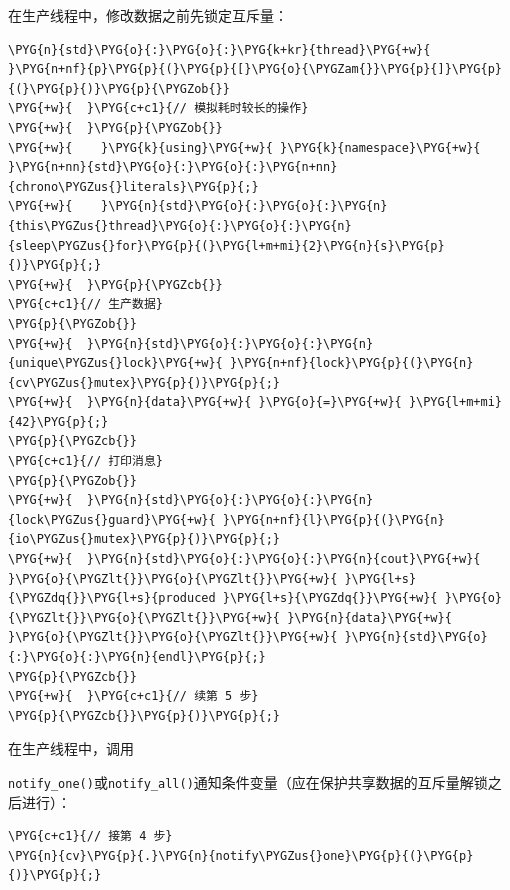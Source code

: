 
在生产线程中，修改数据之前先锁定互斥量：



\begin{codeblockbg}
\begin{Verbatim}[commandchars=\\\{\},breaklines=true,breakanywhere=true,fontsize=\codefont,xleftmargin=17bp]
\PYG{n}{std}\PYG{o}{:}\PYG{o}{:}\PYG{k+kr}{thread}\PYG{+w}{ }\PYG{n+nf}{p}\PYG{p}{(}\PYG{p}{[}\PYG{o}{\PYGZam{}}\PYG{p}{]}\PYG{p}{(}\PYG{p}{)}\PYG{p}{\PYGZob{}}
\PYG{+w}{  }\PYG{c+c1}{// 模拟耗时较长的操作}
\PYG{+w}{  }\PYG{p}{\PYGZob{}}
\PYG{+w}{    }\PYG{k}{using}\PYG{+w}{ }\PYG{k}{namespace}\PYG{+w}{ }\PYG{n+nn}{std}\PYG{o}{:}\PYG{o}{:}\PYG{n+nn}{chrono\PYGZus{}literals}\PYG{p}{;}
\PYG{+w}{    }\PYG{n}{std}\PYG{o}{:}\PYG{o}{:}\PYG{n}{this\PYGZus{}thread}\PYG{o}{:}\PYG{o}{:}\PYG{n}{sleep\PYGZus{}for}\PYG{p}{(}\PYG{l+m+mi}{2}\PYG{n}{s}\PYG{p}{)}\PYG{p}{;}
\PYG{+w}{  }\PYG{p}{\PYGZcb{}}
\PYG{c+c1}{// 生产数据}
\PYG{p}{\PYGZob{}}
\PYG{+w}{  }\PYG{n}{std}\PYG{o}{:}\PYG{o}{:}\PYG{n}{unique\PYGZus{}lock}\PYG{+w}{ }\PYG{n+nf}{lock}\PYG{p}{(}\PYG{n}{cv\PYGZus{}mutex}\PYG{p}{)}\PYG{p}{;}
\PYG{+w}{  }\PYG{n}{data}\PYG{+w}{ }\PYG{o}{=}\PYG{+w}{ }\PYG{l+m+mi}{42}\PYG{p}{;}
\PYG{p}{\PYGZcb{}}
\PYG{c+c1}{// 打印消息}
\PYG{p}{\PYGZob{}}
\PYG{+w}{  }\PYG{n}{std}\PYG{o}{:}\PYG{o}{:}\PYG{n}{lock\PYGZus{}guard}\PYG{+w}{ }\PYG{n+nf}{l}\PYG{p}{(}\PYG{n}{io\PYGZus{}mutex}\PYG{p}{)}\PYG{p}{;}
\PYG{+w}{  }\PYG{n}{std}\PYG{o}{:}\PYG{o}{:}\PYG{n}{cout}\PYG{+w}{ }\PYG{o}{\PYGZlt{}}\PYG{o}{\PYGZlt{}}\PYG{+w}{ }\PYG{l+s}{\PYGZdq{}}\PYG{l+s}{produced }\PYG{l+s}{\PYGZdq{}}\PYG{+w}{ }\PYG{o}{\PYGZlt{}}\PYG{o}{\PYGZlt{}}\PYG{+w}{ }\PYG{n}{data}\PYG{+w}{ }\PYG{o}{\PYGZlt{}}\PYG{o}{\PYGZlt{}}\PYG{+w}{ }\PYG{n}{std}\PYG{o}{:}\PYG{o}{:}\PYG{n}{endl}\PYG{p}{;}
\PYG{p}{\PYGZcb{}}
\PYG{+w}{  }\PYG{c+c1}{// 续第 5 步}
\PYG{p}{\PYGZcb{}}\PYG{p}{)}\PYG{p}{;}
\end{Verbatim}
\end{codeblockbg}



在生产线程中，调用



\texttt{notify\_\allowbreak{}one()}或\texttt{notify\_\allowbreak{}all()}通知条件变量（应在保护共享数据的互斥量解锁之后进行）：



\begin{codeblockbg}
\begin{Verbatim}[commandchars=\\\{\},breaklines=true,breakanywhere=true,fontsize=\codefont,xleftmargin=17bp]
\PYG{c+c1}{// 接第 4 步}
\PYG{n}{cv}\PYG{p}{.}\PYG{n}{notify\PYGZus{}one}\PYG{p}{(}\PYG{p}{)}\PYG{p}{;}
\end{Verbatim}
\end{codeblockbg}



